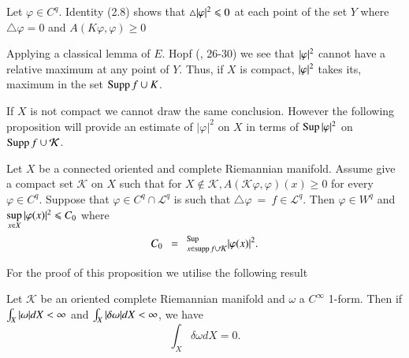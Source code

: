 Let $ \varphi \in  C^q$. Identity (2.8) shows that $ \triangle
\arrowvert \varphi \arrowvert ^2 \leqslant 0 $ at 
each point of the set $Y$ where $\triangle \varphi = 0$ and $A(K
\varphi, \varphi) \geqslant 0$ 

Applying a classical lemma of $E$. Hopf (\cite{key36}, 26-30) we see that
$\arrowvert \varphi \arrowvert^2$  
cannot have a relative maximum at any point of $Y$. Thus, if $X$ is
compact, $\arrowvert \varphi \arrowvert ^2$ takes its, maximum in the
set $\operatorname{Supp} f \cup K$. 

If $X$ is not compact we cannot draw the same conclusion. However the
following proposition will provide an estimate of $|\varphi|^2$
on $X$ in terms of $\operatorname{Sup} |\varphi|^2$ on $\operatorname{Supp} f \cup \mathcal{K}$.

\begin{prop}\label{chap2:prop2.3}%
  Let $X$ be a connected oriented and complete Riemannian manifold. 
  Assume give a compact set $\mathcal {K}$ on $X$ such that for $X
  \notin \mathcal{K},  A(\mathcal{K} \varphi, \varphi)(x) \ge 0$ for
  every $\varphi \in C ^q$. Suppose that $\varphi \in C ^q \cap
  \mathcal{L}^q$ is such that $\triangle \varphi~= ~ f \in
  \mathcal{L}^q$. Then $\varphi \in W^q $ and $\sup\limits_{x\in X}
  \arrowvert \varphi (x) \arrowvert^2   \leqslant C_0$ where    
  $$
  C_0 ~~=~~^{\operatorname{Sup}}_{x \in \operatorname{supp} f \cup \mathcal{K}} \arrowvert \varphi
  (x) \arrowvert^2 .
  $$ 
\end{prop}

For the proof of this proposition we utilise the following result

\begin{lemma}\label{chap2:lem2.4}%
  Let $\mathcal{K}$ be an oriented complete Riemannian  
  manifold and $\omega$ a $C^\infty$ 1-form. Then if 
    $\int_X \arrowvert \omega \arrowvert dX < \infty$ and
    $\int_X \arrowvert \delta \omega \arrowvert dX < \infty$,
  we have  
  $$
  \int_X \delta \omega dX = 0.
  $$
\end{lemma}


